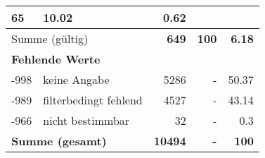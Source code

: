 \begin{longtable}{lXrrr}
       \num{65} &
       \num[round-mode=places,round-precision=2]{10.02} &
         \num[round-mode=places,round-precision=2]{0.62} \\
     \midrule
     \multicolumn{2}{l}{Summe (gültig)} &
       \textbf{\num{649}} &
     \textbf{\num{100}} &
       \textbf{\num[round-mode=places,round-precision=2]{6.18}} \\
     \multicolumn{5}{l}{\textbf{Fehlende Werte}}\\
       -998 &
       keine Angabe &
         \num{5286} &
        - &
         \num[round-mode=places,round-precision=2]{50.37} \\
       -989 &
       filterbedingt fehlend &
         \num{4527} &
        - &
         \num[round-mode=places,round-precision=2]{43.14} \\
       -966 &
       nicht bestimmbar &
         \num{32} &
        - &
         \num[round-mode=places,round-precision=2]{0.3} \\
     \midrule
     \multicolumn{2}{l}{\textbf{Summe (gesamt)}} &
          \textbf{\num{10494}} &
        \textbf{-} &
        \textbf{\num{100}} \\
     \bottomrule
     \end{longtable}
     
